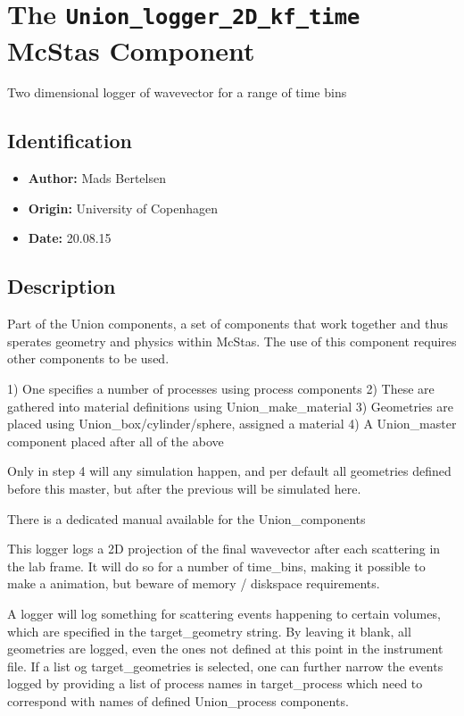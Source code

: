 \section{The \texttt{Union\_logger\_2D\_kf\_time} McStas Component}
Two dimensional logger of wavevector for a range of time bins

\subsection*{Identification}
\begin{itemize}
  \item \textbf{Author:} Mads Bertelsen
  \item \textbf{Origin:} University of Copenhagen
  \item \textbf{Date:} 20.08.15
\end{itemize}

\subsection*{Description}
Part of the Union components, a set of components that work together and thus sperates geometry and physics within McStas. The use of this component requires other components to be used.

1) One specifies a number of processes using process components 2) These are gathered into material definitions using Union\_make\_material 3) Geometries are placed using Union\_box/cylinder/sphere, assigned a material 4) A Union\_master component placed after all of the above

Only in step 4 will any simulation happen, and per default all geometries defined before this master, but after the previous will be simulated here.

There is a dedicated manual available for the Union\_components

This logger logs a 2D projection of the final wavevector after each scattering in the lab frame. It will do so for a number of time\_bins, making it possible to make a animation, but beware of memory / diskspace requirements.

A logger will log something for scattering events happening to certain volumes, which are specified in the target\_geometry string. By leaving it blank, all geometries are logged, even the ones not defined at this point in the instrument file. If a list og target\_geometries is selected, one can further narrow the events logged by providing a list of process names in target\_process which need to correspond with names of defined Union\_process components.

